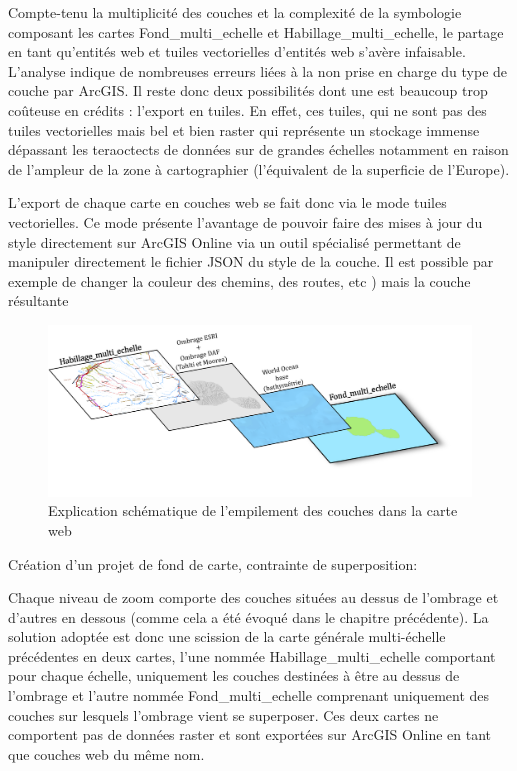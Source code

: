 Compte-tenu la multiplicité des couches et la complexité de la symbologie composant les cartes Fond\_multi\_echelle et Habillage\_multi\_echelle, le partage en tant qu’entités web et tuiles vectorielles d’entités web s’avère infaisable. L’analyse indique de nombreuses erreurs liées à la non prise en charge du type de couche par ArcGIS. Il reste donc deux possibilités dont une est beaucoup trop coûteuse en crédits : l’export en tuiles. En effet, ces tuiles, qui ne sont pas des tuiles vectorielles mais bel et bien raster qui représente un stockage immense dépassant les teraoctects de données sur de grandes échelles notamment en raison de l’ampleur de la zone à cartographier (l’équivalent de la superficie de l’Europe). 

L’export de chaque carte en couches web se fait donc via le mode tuiles vectorielles. Ce mode présente l’avantage de pouvoir faire des mises à jour du style directement sur ArcGIS Online via un outil spécialisé permettant de manipuler directement le fichier JSON du style de la couche. Il est possible par exemple de changer la couleur des chemins, des routes, etc ) mais la couche résultante 

\begin{figure}[ht]
\centering
\includegraphics[width=\linewidth]{images/chap3/empilement.png}
\caption{Explication schématique de l'empilement des couches dans la carte web}
\label{empilement}
\end{figure}

Création d’un projet de fond de carte, contrainte de superposition: 

Chaque niveau de zoom comporte des couches situées au dessus de l’ombrage et d’autres en dessous (comme cela a été évoqué dans le chapitre précédente). La solution adoptée est donc une scission de la carte générale multi-échelle précédentes en deux cartes, l’une nommée Habillage\_multi\_echelle comportant pour chaque échelle, uniquement les couches destinées à être au dessus de l’ombrage et l’autre nommée Fond\_multi\_echelle comprenant uniquement des couches sur lesquels l’ombrage vient se superposer. Ces deux cartes ne comportent pas de données raster et sont exportées sur ArcGIS Online en tant que couches web du même nom. 

